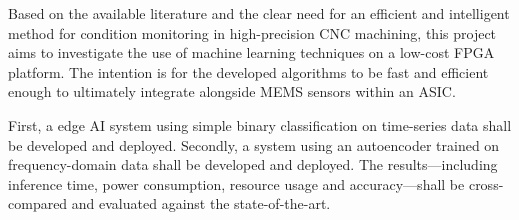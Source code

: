 \documentclass[../main.tex]{subfiles}
\begin{document}
Based on the available literature and the clear need for an efficient and intelligent method for condition monitoring in high-precision CNC machining, this project aims to investigate the use of machine learning techniques on a low-cost FPGA platform. The intention is for the developed algorithms to be fast and efficient enough to ultimately integrate alongside MEMS sensors within an ASIC.

First, a edge AI system using simple binary classification on time-series data shall be developed and deployed. Secondly, a system using an autoencoder trained on frequency-domain data shall be developed and deployed. The results---including inference time, power consumption, resource usage and accuracy---shall be cross-compared and evaluated against the state-of-the-art.

\onecolumn

\biblio
\end{document}
